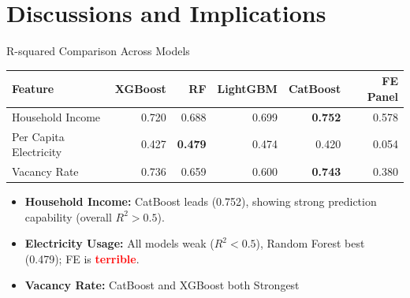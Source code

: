 \documentclass{beamer}
\begin{document}
\section{Discussions and Implications}
\begin{frame}{R-squared Comparison Across Models}
\begin{table}[htbp]
    \small
    \centering
    \begin{tabular}{lrrrrr}
    \toprule
    \textbf{Feature} & XGBoost & RF & LightGBM & CatBoost & FE Panel \\
    \midrule
    Household Income & 0.720 & 0.688 & 0.699 & \textbf{0.752} & 0.578 \\
    Per Capita Electricity & 0.427 & \textbf{0.479} & 0.474 & 0.420 & 0.054 \\
    Vacancy Rate & 0.736 & 0.659 & 0.600 & \textbf{0.743} & 0.380 \\
    \bottomrule
    \end{tabular}
\end{table}

    \begin{itemize}
        \item \textbf{Household Income:} CatBoost leads (0.752), showing strong prediction capability (overall $ R^2 > 0.5$).
        \item \textbf{Electricity Usage:} All models weak ($R^2 < 0.5$), Random Forest best (0.479); FE is \textcolor{red}{\textbf{terrible}}.
        \item \textbf{Vacancy Rate:} CatBoost and XGBoost both Strongest
    \end{itemize}
\end{frame}
\end{document}

